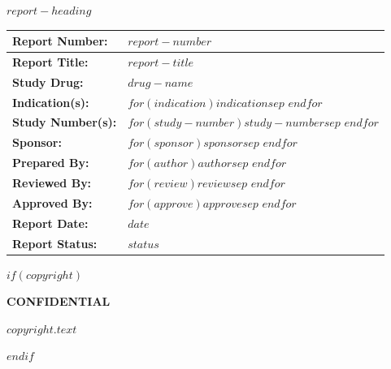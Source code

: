 \thispagestyle{empty}
\vskip2cm
{\centerline{\textbf{$report-heading$}}}
\vskip1cm
\begin{table}[!h]
      \setlength{\tabcolsep}{5pt}
      \renewcommand{\arraystretch}{1.5}
      \begin{tabularx}{\textwidth}{|p{}|X|}
            \hline
            \textbf{Report Number:} & $report-number$\\
            \hline
            \textbf{Report Title:} & $report-title$ \\
            \hline
            \textbf{Study Drug:} &  $drug-name$\\
            \hline
            \textbf{Indication(s):} & $for(indication)$$indication$$sep$ \newline $endfor$\\
            \hline
            \textbf{Study Number(s):} & $for(study-number)$$study-number$$sep$ \newline $endfor$\\
            \hline
            \textbf{Sponsor:} & $for(sponsor)$$sponsor$$sep$ \newline $endfor$\\
            \hline
            \textbf{Prepared By:} & $for(author)$$author$$sep$ \newline $endfor$\\
            \hline
            \textbf{Reviewed By:} & $for(review)$$review$$sep$ \newline $endfor$ \\
            \hline
            \textbf{Approved By:} & $for(approve)$$approve$$sep$ \newline $endfor$\\
            \hline
            \textbf{Report Date:} & $date$\\
            \hline
            \textbf{Report Status:}  & $status$\\
            \hline
      \end{tabularx}
\end{table}
\vskip0.5cm
$if(copyright)$
\begin{center}
{\textbf{CONFIDENTIAL}}
\begin{mdframed}
    {\normalsize $copyright.text$}
\end{mdframed}
\end{center}
$endif$


